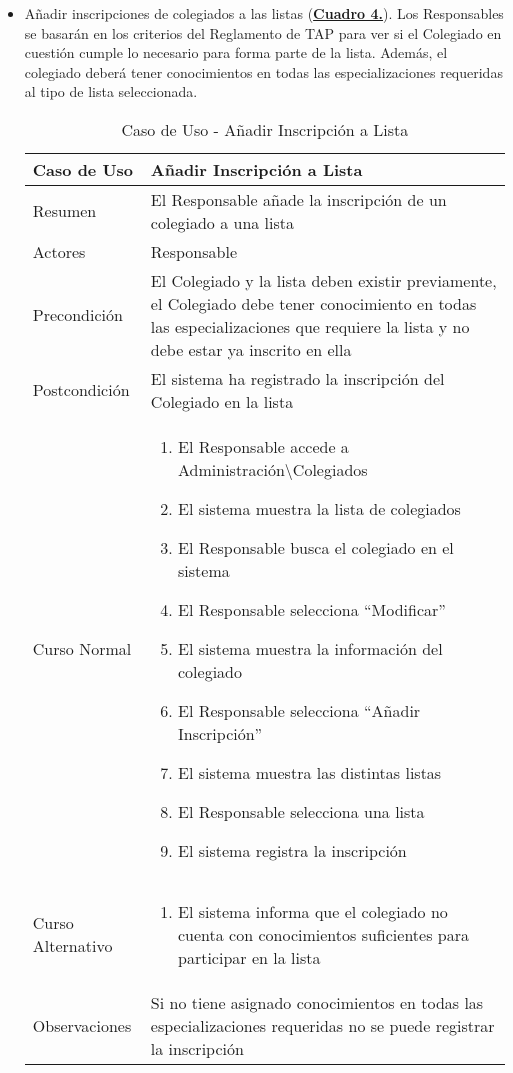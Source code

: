 \begin{itemize}
  \newpage~
	\item \addtocounter{tabla}{1} Añadir inscripciones de colegiados a las listas (\textbf{\hyperref[tab:curCrearInscrLst]{Cuadro 4.}}). Los Responsables se basarán en los criterios del Reglamento de TAP \cite{reglamentotapcpiia} para ver si el Colegiado en cuestión cumple lo necesario para forma parte de la lista. Además, el colegiado deberá tener conocimientos en todas las especializaciones requeridas al tipo de lista seleccionada.
		\begin{table}[!htbp]
		  \centering  \addtocounter{casouso}{1}
		  \begin{tabular}{|l | p{100mm}|}
		    \textbf{Caso de Uso}  & \textbf{Añadir Inscripción a Lista} \\ \hline
		    Resumen 		 & El Responsable añade la inscripción de un colegiado a una lista \\ \hline
		    Actores  		 & Responsable \\ \hline
		    Precondición  	 & El Colegiado y la lista deben existir previamente, el Colegiado debe tener conocimiento en todas las especializaciones que requiere la lista y no debe estar ya inscrito en ella \\ \hline
		    Postcondición  	 & El sistema ha registrado la inscripción del Colegiado en la lista \\ \hline
		    Curso Normal   	 & \begin{enumerate}
			  \item El Responsable accede a Administración\textbackslash Colegiados
			  \item El sistema muestra la lista de colegiados
			  \item El Responsable busca el colegiado en el sistema
			  \item El Responsable selecciona ``Modificar''
			  \item El sistema muestra la información del colegiado
			  \item El Responsable selecciona ``Añadir Inscripción''
			  \item El sistema muestra las distintas listas
			  \item El Responsable selecciona una lista
			  \item El sistema registra la inscripción
		    \end{enumerate}  \\ \hline
		    Curso Alternativo  & \begin{enumerate}
			  \item El sistema informa que el colegiado no cuenta con conocimientos suficientes para participar en la lista
		    \end{enumerate}  \\ \hline
		    Observaciones 	 & Si no tiene asignado conocimientos en todas las especializaciones requeridas no se puede registrar la inscripción \\ \hline
		  \end{tabular}
		  \caption{Caso de Uso  - Añadir Inscripción a Lista}
		  \label{tab:curCrearInscrLst}
		\end{table}
		\FloatBarrier
		

\end{itemize}
